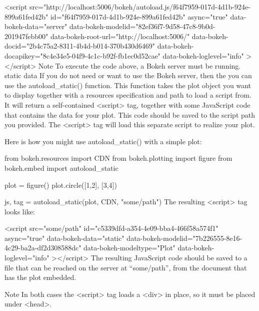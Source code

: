 <script
    src="http://localhost:5006/bokeh/autoload.js/f64f7959-017d-4d1b-924e-899a61fed42b"
    id="f64f7959-017d-4d1b-924e-899a61fed42b"
    async="true"
    data-bokeh-data="server"
    data-bokeh-modelid="82ef36f7-9d58-47c8-9b0d-201947febb00"
    data-bokeh-root-url="http://localhost:5006/"
    data-bokeh-docid="2b4c75a2-8311-4b4d-b014-370b430d6469"
    data-bokeh-docapikey="8c4e34e5-04f9-4c1c-b92f-fb1ec0d52cae"
    data-bokeh-loglevel="info"
></script>
Note
To execute the code above, a Bokeh server must be running.
static data
If you do not need or want to use the Bokeh server, then the you can use the autoload_static() function. This function takes the plot object you want to display together with a resources specification and path to load a script from. It will return a self-contained <script> tag, together with some JavaScript code that contains the data for your plot. This code should be saved to the script path you provided. The <script> tag will load this separate script to realize your plot.

Here is how you might use autoload_static() with a simple plot:

from bokeh.resources import CDN
from bokeh.plotting import figure
from bokeh.embed import autoload_static

plot = figure()
plot.circle([1,2], [3,4])

js, tag = autoload_static(plot, CDN, "some/path")
The resulting <script> tag looks like:

<script
    src="some/path"
    id="c5339dfd-a354-4e09-bba4-466f58a574f1"
    async="true"
    data-bokeh-data="static"
    data-bokeh-modelid="7b226555-8e16-4c29-ba2a-df2d308588dc"
    data-bokeh-modeltype="Plot"
    data-bokeh-loglevel="info"
></script>
The resulting JavaScript code should be saved to a file that can be reached on the server at “some/path”, from the document that has the plot embedded.

Note
In both cases the <script> tag loads a <div> in place, so it must be placed under <head>.
